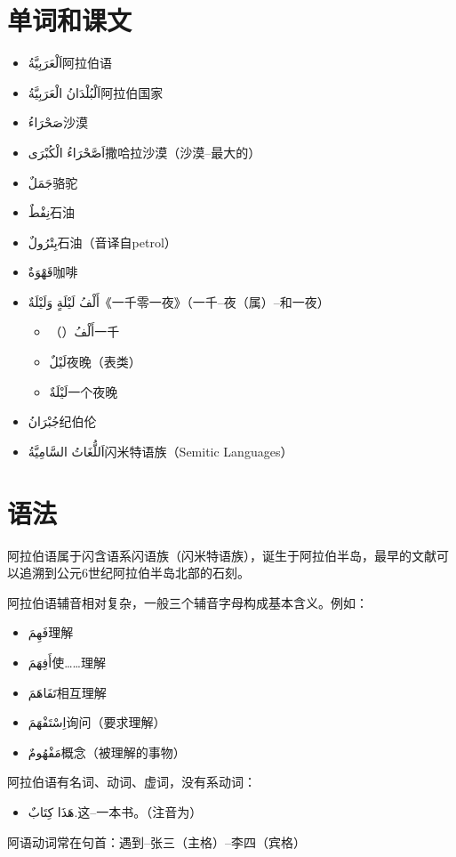 \section{单词和课文}

\begin{itemize}
    \item \ac{اَلْعَرَبِيَّةُ}{阿拉伯语}
    \item \ac{اَلْبُلْدَانُ الْعَرَبِيَّةُ}{阿拉伯国家}
    \item \ac{صَحْرَاءُ}{沙漠}
    \item \ac{اَصَّحْرَاءُ الْكُبْرَى}{撒哈拉沙漠（沙漠--最大的）}
    \item \ac{جَمَلٌ}{骆驼}
    \item \ac{نِفْطٌ}{石油}
    \item \ac{بِتْرُولٌ}{石油（音译自petrol）}
    \item \ac{قَهْوَةٌ}{咖啡}
    \item \ac{أَلْفُ لَيْلَةٍ وَلَيْلَةٌ}{《一千零一夜》（一千--夜（属）--和一夜）}
    \begin{itemize}
        \item （）\ac{أَلْفُ}{一千}
        \item \ac{لَيْلٌ}{夜晚（表类）}
        \item \ac{لَيْلَةٌ}{一个夜晚}
    \end{itemize}
    \item \ac{جُبْرَانُ}{纪伯伦}
    \item \ac{اَللُّغَاتُ السَّامِيَّةُ}{闪米特语族（Semitic Languages）}
\end{itemize}

\section{语法}

阿拉伯语属于闪含语系闪语族（闪米特语族），诞生于阿拉伯半岛，最早的文献可以追溯到公元6世纪阿拉伯半岛北部的石刻。

阿拉伯语辅音相对复杂，一般三个辅音字母构成基本含义。例如：

\begin{itemize}
    \item \ac{فَهِمَ}{理解}
    \item \ac{أَفِهَمَ}{使……理解}
    \item \ac{تَفَاهَمَ}{相互理解}
    \item \ac{اِسْتَفْهَمَ}{询问（要求理解）}
    \item \ac{مَفْهُومٌ}{概念（被理解的事物）}
\end{itemize}

阿拉伯语有名词、动词、虚词，没有系动词：

\begin{itemize}
    \item \ac{هَذَا كِتَابٌ.}{这--一本书。（注音为）}
\end{itemize}

阿语动词常在句首：遇到--张三（主格）--李四（宾格）
